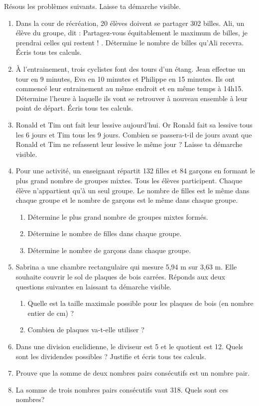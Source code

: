 \begin{exercise}
  Résous les problèmes suivants. Laisse ta démarche visible.
  \begin{enumerate}
    \item Dans la cour de récréation, 20 élèves doivent se partager 302 billes. Ali, un élève du groupe, dit : \og Partagez-vous équitablement le maximum de billes, je prendrai celles qui restent ! \fg. Détermine le nombre de billes qu'Ali recevra. Écris tous tes calculs.
    \item À l'entrainement, trois cyclistes font des tours d'un étang. Jean effectue un tour en 9 minutes, Eva en 10 minutes et Philippe en 15 minutes. Ils ont commencé leur entrainement au même endroit et en même temps à 14h15. Détermine l'heure à laquelle ils vont se retrouver à nouveau ensemble à leur point de départ. Écris tous tes calculs.
    \item Ronald et Tim ont fait leur lessive aujourd'hui. Or Ronald fait sa lessive tous les 6 jours et Tim tous les 9 jours. Combien se passera-t-il de jours avant que Ronald et Tim ne refassent leur lessive le même jour ? Laisse ta démarche visible.
    \item Pour une activité, un enseignant répartit 132 filles et 84 garçons en formant le plus grand nombre de groupes mixtes. Tous les élèves participent. Chaque élève n'appartient qu'à un seul groupe. Le nombre de filles est le même dans chaque groupe et le nombre de garçons est le même dans chaque groupe.
          \begin{enumerate}[label=\arabic*)]
            \item Détermine le plus grand nombre de groupes mixtes formés.
            \item Détermine le nombre de filles dans chaque groupe.
            \item Détermine le nombre de garçons dans chaque groupe.
          \end{enumerate}
    \item Sabrina a une chambre rectangulaire qui mesure 5,94 m sur 3,63 m. Elle
          souhaite couvrir le sol de plaques de bois carrées. Réponds aux deux
          questions suivantes en laissant ta démarche visible.
          \begin{enumerate}[label=\arabic*)]
            \item Quelle est la taille maximale possible pour les plaques de bois (en
                  nombre entier de cm) ?
            \item Combien de plaques va-t-elle utiliser ?
          \end{enumerate}
    \item Dans une division euclidienne, le diviseur est 5 et le quotient est 12. Quels sont les dividendes possibles ? Justifie et écris tous tes calculs.
    \item Prouve que la somme de deux nombres pairs consécutifs est un nombre pair.
    \item La somme de trois nombres pairs consécutifs vaut 318. Quels sont ces nombres?
  \end{enumerate}
\end{exercise}
